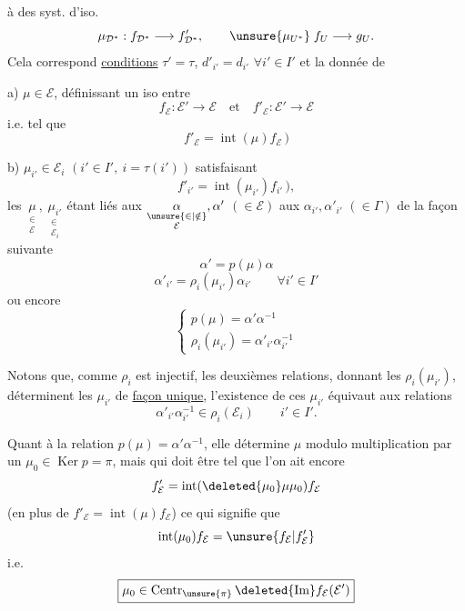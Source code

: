 
 à des syst. d'iso.
\[
\mu_{\mathcal D^*}:f_{\mathcal D^*}\longrightarrow f'_{\mathcal D^*},\qquad
\unsure{\mu_{U^*}}\;f_U\longrightarrow g_U.
\]
Cela correspond \uline{conditions} $\tau'=\tau$, $d'_{i'}=d_{i'}$ $\forall i'\in I'$ et  la donnée de

a) $\boxed{\boxed{\mu\in\mathcal E}}$, définissant un iso entre
\[
f_{\mathcal E}:\mathcal E'\longrightarrow\mathcal E
\quad\text{et}\quad
f'_{\mathcal E}:\mathcal E'\longrightarrow\mathcal E
\]
i.e.  tel que
\[
\boxed{f'_{\mathcal E}=\operatorname{int}(\mu)f_{\mathcal E}}\,)
\]

b) $\boxed{\boxed{\mu_{i'}\in\mathcal E_i}}$ $(i'\in I',\ i=\tau(i'))$
satisfaisant
\[
\boxed{f'_{i'}=\operatorname{int}(\mu_{i'})f_{i'}}\,),
\]
les $\underset{\substack{\in\\\mathcal E}}{\mu},\ \underset{\substack{\in\\\mathcal E_i}}{\mu_{i'}}$ étant liés aux $\underset{\substack{\unsure{\in|\notin}\\\mathcal E}}{\alpha},\alpha'$  $(\in\mathcal E)$
aux $\alpha_{i'},\alpha'_{i'}$ $(\in\Gamma)$ de la façon suivante
\[
\boxed{\alpha'=p(\mu)\alpha}
\]
\[
\boxed{\alpha'_{i'}=\rho_i(\mu_{i'})\alpha_{i'}}\qquad\forall i'\in I'
\]
ou encore
\[
\boxed{\begin{cases}
p(\mu)=\alpha'\alpha^{-1}\\
\rho_i(\mu_{i'})=\alpha'_{i'}\alpha_{i'}^{-1}
\end{cases}}
\]

Notons que, comme $\rho_i$ est injectif, les deuxièmes relations, donnant les $\rho_i(\mu_{i'})$, déterminent les $\mu_{i'}$ de \uline{façon unique}, l'existence de ces $\mu_{i'}$ équivaut aux relations
\[
\boxed{\alpha'_{i'}\alpha_{i'}^{-1}\in\rho_i(\mathcal E_i)}\qquad i'\in I'.
\]

Quant à la relation $p(\mu)=\alpha'\alpha^{-1}$, elle détermine $\mu$ modulo multiplication  par un  $\mu_0\in\operatorname{Ker}p=\pi$, mais qui doit être tel que l'on ait encore
\[
f'_{\mathcal E}=\operatorname{int}(\deleted{\mu_0}\mu\mu_0)f_{\mathcal E}
\]
(en plus de $f'_{\mathcal E}=\operatorname{int}(\mu)f_{\mathcal E}$) ce qui signifie  que
\[
\operatorname{int}(\mu_0)f_{\mathcal E}=\unsure{f_{\mathcal E}|f'_{\mathcal E}}
\]
i.e.
\[
\boxed{\mu_0\in\operatorname{Centr}_{\unsure{\pi}}\deleted{\operatorname{Im}}f_{\mathcal E}(\mathcal E')}
\]

